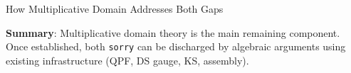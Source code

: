 \documentclass[aspectratio=169,10pt]{beamer}
\begin{document}
\begin{frame}{How Multiplicative Domain Addresses Both Gaps}
\begin{center}
    \end{center}

    \vspace{0.1em}
    {\small\textbf{Summary}: Multiplicative domain theory is the main remaining component.
    Once established, both \texttt{sorry} can be discharged by algebraic arguments using
    existing infrastructure (QPF, DS gauge, KS, assembly).}
\end{frame}

\end{document}
